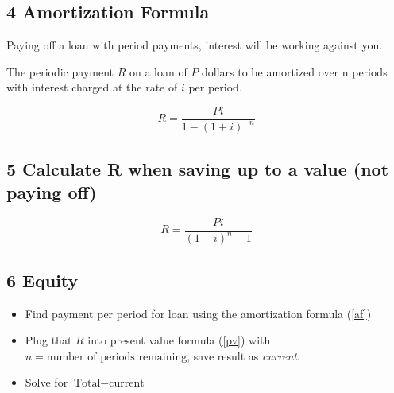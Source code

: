 \documentclass[twocolumn]{article}
\begin{document}
	\subsection*{4 Amortization Formula}
	Paying off a loan with period payments, interest will be working against you.
	
	The periodic payment $R$ on a loan of $P$ dollars to be amortized over n periods with interest charged at the rate of $i$ per period.
	
	\begin{equation} \label{af}
		R = \frac{Pi}{1-(1+i)^{-n}}
	\end{equation}

	\subsection*{5 Calculate R when saving up to a value (not paying off)}
	
	\begin{equation}
		R = \frac{Pi}{(1+i)^n-1}
	\end{equation}

	\subsection*{6 Equity}
	
	\begin{itemize}[label=--]
		\item Find payment per period for loan using the amortization formula (\ref{af})
		\item Plug that $R$ into present value formula (\ref{pv}) with $n = \text{number of periods remaining}$, save result as \emph{current}.
		\item Solve for $\text{Total} - \text{current}$
	\end{itemize}
\end{document}
